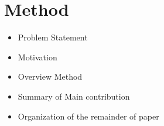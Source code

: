 \section{Method}
\label{sec:method}

\begin{itemize}
    \item Problem Statement
    \item Motivation
    \item Overview Method
    \item Summary of Main contribution %
    \item Organization of the remainder of paper
\end{itemize}
